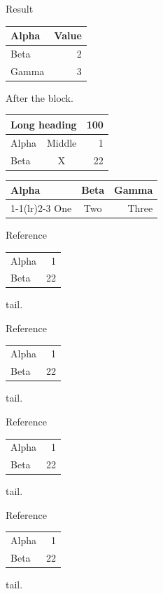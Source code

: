 \documentclass[aspectratio=169]{beamer}
\begin{document}
\begin{frame}[plain,t]
\begin{block}{Result}
\begin{tabular}{lr}\toprule Alpha & Value\\ \midrule Beta & 2\\ Gamma & 3\\ \bottomrule\end{tabular}
\end{block}
After the block.
\end{frame}
\begin{frame}[plain,t]
\begin{tabular}{|l|c|r|}
\hline
\multicolumn{2}{|c|}{Long heading} & 100\\
\hline Alpha & Middle & 1\\ Beta & X & 22\\ \hline
\end{tabular}
\end{frame}
\begin{frame}[plain,t]
\begin{tabular}{@{}l@{}cr@{}}
\toprule Alpha & Beta & Gamma\\
\cmidrule(lr){1-1}\cmidrule(lr){2-3}
One & Two & Three\\ \bottomrule
\end{tabular}
\end{frame}
\begin{frame}[plain,t]
Reference \begin{tabular}[t]{lr}\toprule Alpha&1\\Beta&22\\\bottomrule\end{tabular} tail.

Reference \begin{tabular}[b]{lr}\toprule Alpha&1\\Beta&22\\\bottomrule\end{tabular} tail.

Reference \begin{tabular}[t]{lr}\hline Alpha&1\\Beta&22\\\hline\end{tabular} tail.

Reference \begin{tabular}[b]{lr}\hline Alpha&1\\Beta&22\\\hline\end{tabular} tail.
\end{frame}
\end{document}
